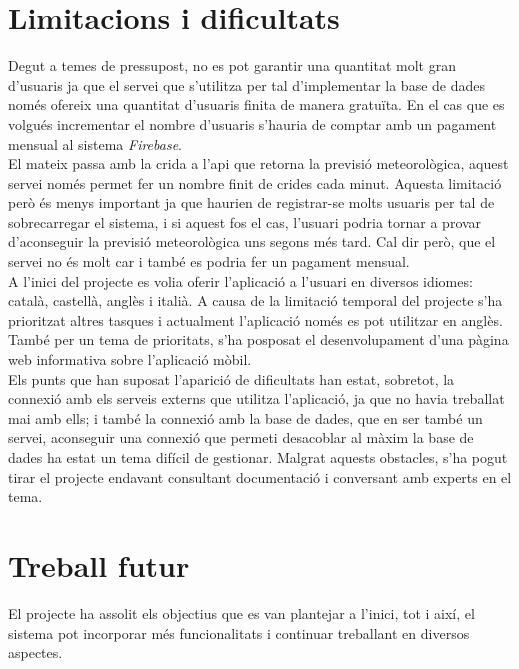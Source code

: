 \section{Limitacions i dificultats}
Degut a temes de pressupost, no es pot garantir una quantitat molt gran d'usuaris ja que el servei que s'utilitza per tal d'implementar la base de dades només ofereix una quantitat d'usuaris finita de manera gratuïta. En el cas que es volgués incrementar el nombre d'usuaris s'hauria de comptar amb un pagament mensual al sistema \textit{Firebase}.\\

El mateix passa amb la crida a l'api que retorna la previsió meteorològica, aquest servei només permet fer un nombre finit de crides cada minut. Aquesta limitació però és menys important ja que haurien de registrar-se molts usuaris per tal de sobrecarregar el sistema, i si aquest fos el cas, l'usuari podria tornar a provar d'aconseguir la previsió meteorològica uns segons més tard. Cal dir però, que el servei no és molt car i també es podria fer un pagament mensual.\\

A l'inici del projecte es volia oferir l'aplicació a l'usuari en diversos idiomes: català, castellà, anglès i italià. A causa de la limitació temporal del projecte s'ha prioritzat altres tasques i actualment l'aplicació només es pot utilitzar en anglès. També per un tema de prioritats, s'ha posposat el desenvolupament d'una pàgina web informativa sobre l'aplicació mòbil.\\

Els punts que han suposat l'aparició de dificultats han estat, sobretot, la connexió amb els serveis externs que utilitza l'aplicació, ja que no havia treballat mai amb ells; i també la connexió amb la base de dades, que en ser també un servei, aconseguir una connexió que permeti desacoblar al màxim la base de dades ha estat un tema difícil de gestionar. Malgrat aquests obstacles, s'ha pogut tirar el projecte endavant consultant documentació i conversant amb experts en el tema.

\section{Treball futur}

El projecte ha assolit els objectius que es van plantejar a l'inici, tot i així, el sistema pot incorporar més funcionalitats i continuar treballant en diversos aspectes.\\

